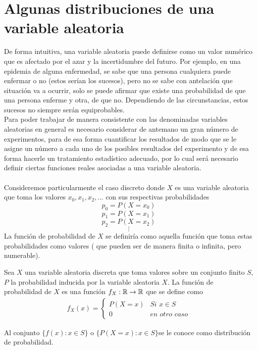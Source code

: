 \section{Algunas distribuciones de una variable aleatoria}
De forma intuitiva, una variable aleatoria puede definirse como un valor numérico que es afectado por el azar y la incertidumbre del futuro. Por ejemplo, en una epidemia de alguna enfermedad, se sabe que una persona cualquiera puede enfermar o no (estos serían los sucesos), pero no se sabe con antelación que situación va a ocurrir, solo se puede afirmar que existe una probabilidad de que una persona enferme y otra, de que no. Dependiendo de las circunstancias, estos sucesos no siempre serán equiprobables.\\
Para poder trabajar de manera consistente con las denominadas variables aleatorias en general es necesario considerar de antemano un gran número de experimentos, para de esa forma cuantificar los resultados de modo que se le asigne un número a cada uno de los posibles resultados del experimento y de esa forma hacerle un tratamiento estadístico adecuado, por lo cual será necesario definir ciertas funciones reales asociadas a una variable aleatoria.
\\\\
Consideremos particularmente el caso discreto donde $X$ es una variable aleatoria que toma los valores $x_0,x_1,x_2,\ldots$ con sus respectivas probabilidades
$$p_0=P(X=x_0)$$
$$p_1=P(X=x_1)$$
$$p_2=P(X=x_2)$$
$$\vdots$$
La función de probabilidad de $X$ se definiría como aquella función que toma estas probabilidades como valores ( que pueden ser de manera finita o infinita, pero numerable).
\begin{Def}
    Sea $X$ una variable aleatoria discreta que toma valores sobre un conjunto finito $S$, $P$ la probabilidad inducida por la variable aleatoria $X$. La función de probabilidad de $X$ es una función  $f_{X}:{\mathbb{R}}\rightarrow{\mathbb{R}}$ que se define como
    \begin{eqnarray*}
        f_{X}(x)=
        \begin{cases}
            P(X=x) &\textit{Si }x\in S\\0 &\textit{en otro caso}\label{def-funcionProbabilidad}
        \end{cases}
    \end{eqnarray*}
\end{Def}
\begin{Def}
\label{def-distribuciónProb}
    Al conjunto $\{f(x): x\in S\}$ o $\{P(X=x): x\in S\} $se le conoce como distribución de probabilidad.
\end{Def}
